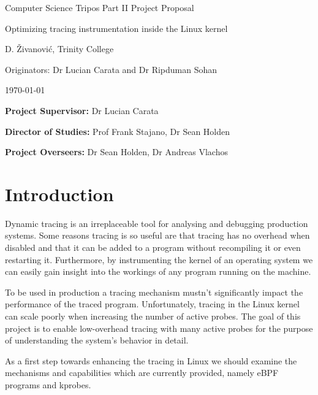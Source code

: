 \centerline{\Large Computer Science Tripos \textendash{} Part II \textendash{} Project Proposal}
\vspace{6mm}
\centerline{\Large Optimizing tracing instrumentation inside the Linux kernel}
\vspace{6mm}
\centerline{\large D. Živanović, Trinity College}
\vspace{4mm}
\centerline{\large Originators: Dr Lucian Carata and Dr Ripduman Sohan}
\vspace{4mm}
\centerline{\large \today}

\vspace{8mm}

\noindent
{\bf Project Supervisor:} Dr Lucian Carata
\vspace{2mm}

\noindent
{\bf Director of Studies:} Prof Frank Stajano, Dr Sean Holden
\vspace{2mm}
 
\noindent
{\bf Project Overseers:} Dr Sean Holden, Dr Andreas Vlachos

\newcommand{\kamprobe}[1]{\texttt{#1}}


\section*{Introduction}

    Dynamic tracing is an irreplaceable tool for analysing and debugging production systems. 
    Some reasons tracing is so useful are that tracing has no overhead 
    when disabled and that it can be added to a program without recompiling it or even restarting it. 
    Furthermore, by instrumenting the kernel of an operating system we can easily gain insight into
    the workings of any program running on the machine.

    To be used in production a tracing mechanism mustn't significantly impact the performance of the 
    traced program. Unfortunately, tracing in the Linux kernel can scale poorly when increasing the number of active probes.
    The goal of this project is to enable low-overhead tracing with many active probes for the purpose of
    understanding the system's behavior in detail.

    As a first step towards enhancing the tracing in Linux we should examine the mechanisms and capabilities
    which are currently provided, namely eBPF programs and kprobes.

